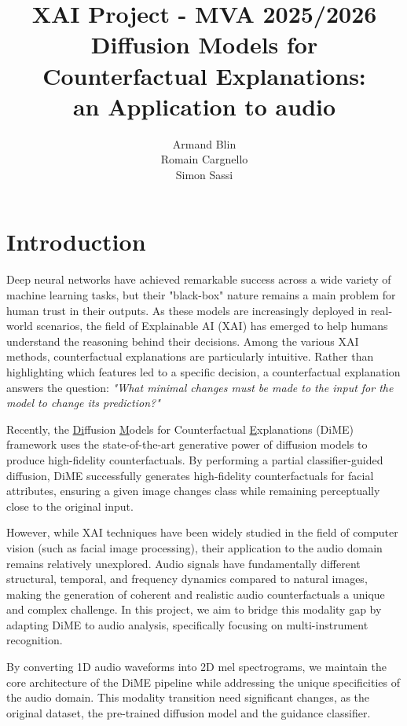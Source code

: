 \documentclass[11pt]{article}
\title{XAI Project - MVA 2025/2026\\Diffusion Models for
Counterfactual Explanations:\\an Application to audio}
\author{
  Armand Blin \email{armand.blin@epita.fr} \\
  Romain Cargnello \email{romain.cargnello1@gmail.com} \\ %
  Simon Sassi \email{sassisimon84@gmail.com} %
}
\begin{document}
\maketitle
\thispagestyle{empty}
\tableofcontents

\newpage

\section{Introduction}

Deep neural networks have achieved remarkable success across a wide
variety of machine learning tasks, but their "black-box" nature
remains a main problem for human trust in their outputs. As these
models are increasingly deployed in real-world scenarios, the field
of Explainable AI (XAI) has emerged to help humans understand the
reasoning behind their decisions. Among the various XAI methods,
counterfactual explanations are particularly intuitive. Rather than
highlighting which features led to a specific decision, a
counterfactual explanation answers the question: \textit{"What
  minimal changes must be made to the input for the model to change its
prediction?"}

Recently, the \underline{Di}ffusion \underline{M}odels for
Counterfactual \underline{E}xplanations (DiME) framework
\cite{jeanneret2022diffusion} uses the state-of-the-art generative
power of diffusion models to produce high-fidelity counterfactuals.
By performing a partial classifier-guided diffusion, DiME
successfully generates high-fidelity counterfactuals for facial
attributes, ensuring a given image changes class while remaining
perceptually close to the original input.

However, while XAI techniques have been widely studied in the field
of computer vision (such as facial image processing), their
application to the audio domain remains relatively unexplored. Audio
signals have fundamentally different structural, temporal, and
frequency dynamics compared to natural images, making the generation
of coherent and realistic audio counterfactuals a unique and complex
challenge. In this project, we aim to bridge this modality gap by
adapting DiME to audio analysis, specifically focusing on
multi-instrument recognition.

By converting 1D audio waveforms into 2D mel spectrograms, we
maintain the core architecture of the DiME pipeline while addressing
the unique specificities of the audio domain. This modality
transition need significant changes, as the original dataset, the
pre-trained diffusion model and the guidance classifier.
\end{document}
